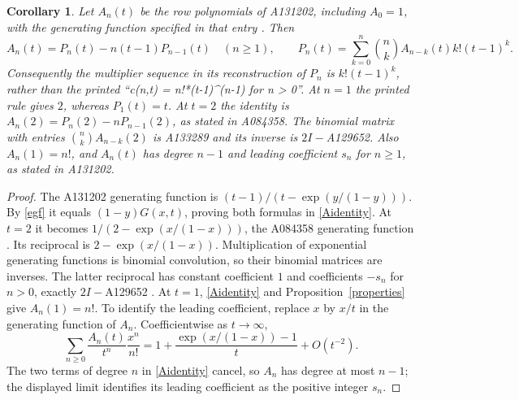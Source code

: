 \documentclass[11pt]{article}
\newtheorem{corollary}[theorem]{Corollary}
\begin{document}
\begin{corollary}\label{related}
Let $A_n(t)$ be the row polynomials of A131202, including $A_0=1$,
with the generating function specified in that entry \cite{related}.
Then
\begin{equation}\label{Aidentity}
 A_n(t)=P_n(t)-n(t-1)P_{n-1}(t)\quad(n\geq1),\qquad
 P_n(t)=\sum_{k=0}^n\binom nk A_{n-k}(t)k!(t-1)^k.
\end{equation}
Consequently the multiplier sequence in its reconstruction of $P_n$
is $k!(t-1)^k$, rather than the printed
``c(n,t) = n!*(t-1)\^{}(n-1) for n > 0''.
At $n=1$ the printed rule gives $2$, whereas $P_1(t)=t$.
At $t=2$ the identity is $A_n(2)=P_n(2)-nP_{n-1}(2)$, as stated in
A084358. The binomial matrix with entries
$\binom nk A_{n-k}(2)$ is A133289 and its inverse is $2I-$A129652.
Also $A_n(1)=n!$, and $A_n(t)$ has degree $n-1$ and leading
coefficient $s_n$ for $n\geq1$, as stated in A131202.
\end{corollary}
\begin{proof}
The A131202 generating function is $(t-1)/(t-\exp(y/(1-y)))$.
By \eqref{egf} it equals $(1-y)G(x,t)$, proving both formulas in
\eqref{Aidentity}. At $t=2$ it becomes $1/(2-\exp(x/(1-x)))$, the
A084358 generating function \cite{lists}. Its reciprocal is
$2-\exp(x/(1-x))$. Multiplication of exponential generating functions
is binomial convolution, so their binomial matrices are inverses.
The latter reciprocal has constant coefficient $1$ and coefficients
$-s_n$ for $n>0$, exactly $2I-$A129652 \cite{riordan,inverse}.
At $t=1$, \eqref{Aidentity} and Proposition~\ref{properties} give
$A_n(1)=n!$. To identify the leading coefficient, replace $x$ by $x/t$
in the generating function of $A_n$. Coefficientwise as $t\to\infty$,
\[
 \sum_{n\geq0}\frac{A_n(t)}{t^n}\frac{x^n}{n!}
 =1+\frac{\exp(x/(1-x))-1}{t}+O(t^{-2}).
\]
The two terms of degree $n$ in \eqref{Aidentity} cancel, so $A_n$ has
degree at most $n-1$; the displayed limit identifies its leading
coefficient as the positive integer $s_n$.
\end{proof}
\end{document}
